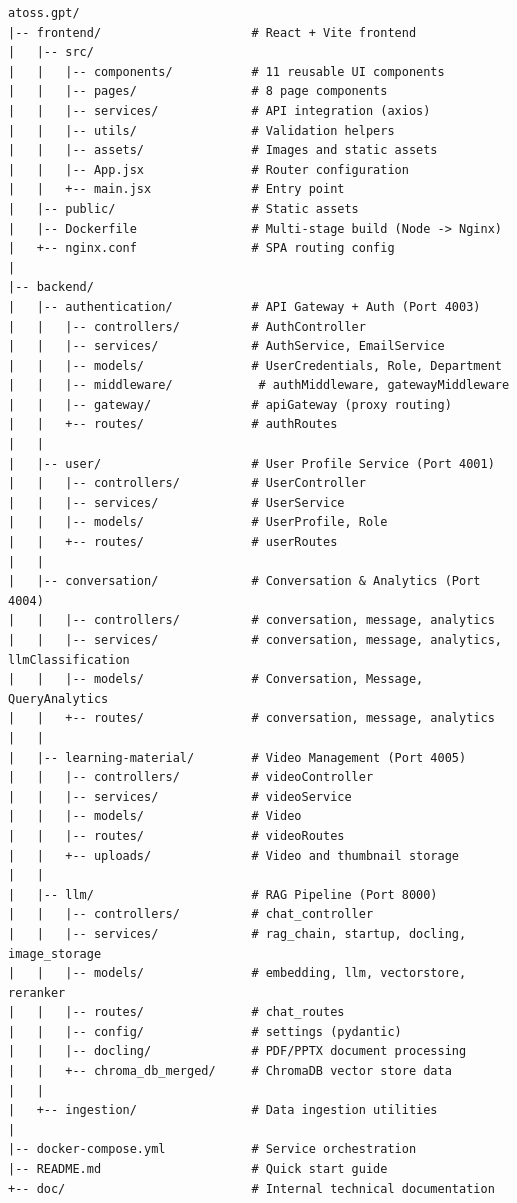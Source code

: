 \documentclass[a4paper,12pt]{report}
\begin{document}
\begin{lstlisting}[basicstyle=\ttfamily\footnotesize, frame=none, numbers=none, backgroundcolor=\color{white}]
atoss.gpt/
|-- frontend/                     # React + Vite frontend
|   |-- src/
|   |   |-- components/           # 11 reusable UI components
|   |   |-- pages/                # 8 page components
|   |   |-- services/             # API integration (axios)
|   |   |-- utils/                # Validation helpers
|   |   |-- assets/               # Images and static assets
|   |   |-- App.jsx               # Router configuration
|   |   +-- main.jsx              # Entry point
|   |-- public/                   # Static assets
|   |-- Dockerfile                # Multi-stage build (Node -> Nginx)
|   +-- nginx.conf                # SPA routing config
|
|-- backend/
|   |-- authentication/           # API Gateway + Auth (Port 4003)
|   |   |-- controllers/          # AuthController
|   |   |-- services/             # AuthService, EmailService
|   |   |-- models/               # UserCredentials, Role, Department
|   |   |-- middleware/            # authMiddleware, gatewayMiddleware
|   |   |-- gateway/              # apiGateway (proxy routing)
|   |   +-- routes/               # authRoutes
|   |
|   |-- user/                     # User Profile Service (Port 4001)
|   |   |-- controllers/          # UserController
|   |   |-- services/             # UserService
|   |   |-- models/               # UserProfile, Role
|   |   +-- routes/               # userRoutes
|   |
|   |-- conversation/             # Conversation & Analytics (Port 4004)
|   |   |-- controllers/          # conversation, message, analytics
|   |   |-- services/             # conversation, message, analytics, llmClassification
|   |   |-- models/               # Conversation, Message, QueryAnalytics
|   |   +-- routes/               # conversation, message, analytics
|   |
|   |-- learning-material/        # Video Management (Port 4005)
|   |   |-- controllers/          # videoController
|   |   |-- services/             # videoService
|   |   |-- models/               # Video
|   |   |-- routes/               # videoRoutes
|   |   +-- uploads/              # Video and thumbnail storage
|   |
|   |-- llm/                      # RAG Pipeline (Port 8000)
|   |   |-- controllers/          # chat_controller
|   |   |-- services/             # rag_chain, startup, docling, image_storage
|   |   |-- models/               # embedding, llm, vectorstore, reranker
|   |   |-- routes/               # chat_routes
|   |   |-- config/               # settings (pydantic)
|   |   |-- docling/              # PDF/PPTX document processing
|   |   +-- chroma_db_merged/     # ChromaDB vector store data
|   |
|   +-- ingestion/                # Data ingestion utilities
|
|-- docker-compose.yml            # Service orchestration
|-- README.md                     # Quick start guide
+-- doc/                          # Internal technical documentation
\end{lstlisting}
\end{document}
